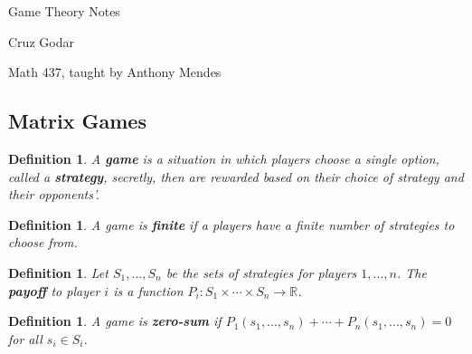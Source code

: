 \documentclass{article}
\theoremstyle{colontheorem}
\newtheorem{definition}[theorem]{Definition}
\newenvironment{Def}
{
	\begin{mdframed}[backgroundcolor=DefGreen!10]
	\begin{definition}
}
{
	\end{definition}
	\end{mdframed}
	
	\vspace{.15in}
}
\begin{document}
\vspace*{.5in}

\begin{center}
	\Huge Game Theory Notes\\
	
	\vspace{.25in}
	
	\Large Cruz Godar\\
	
	\vspace{.25in}
	
	\normalsize Math 437, taught by Anthony Mendes
\end{center}

\vspace{.5in}





\begin{center}
	\section{Matrix Games}
	\vspace{.1in}
\end{center}



\begin{Def}
	
	A \textbf{game} is a situation in which players choose a single option, called a \textbf{strategy}, secretly, then are rewarded based on their choice of strategy and their opponents'.
	
\end{Def}



\begin{Def}
	
	A game is \textbf{finite} if a  players have a finite number of strategies to choose from.
	
\end{Def}



\begin{Def}
	
	Let $S_1, ..., S_n$ be the sets of strategies for players $1, ..., n$. The \textbf{payoff} to player $i$ is a function $P_i : S_1 \times \cdots \times S_n \longrightarrow \mathbb{R}$.
	
\end{Def}



\begin{Def}
	
	A game is \textbf{zero-sum} if $P_1(s_1, ..., s_n) + \cdots + P_n(s_1, ..., s_n) = 0$ for all $s_i \in S_i$.
	
\end{Def}
\end{document}
